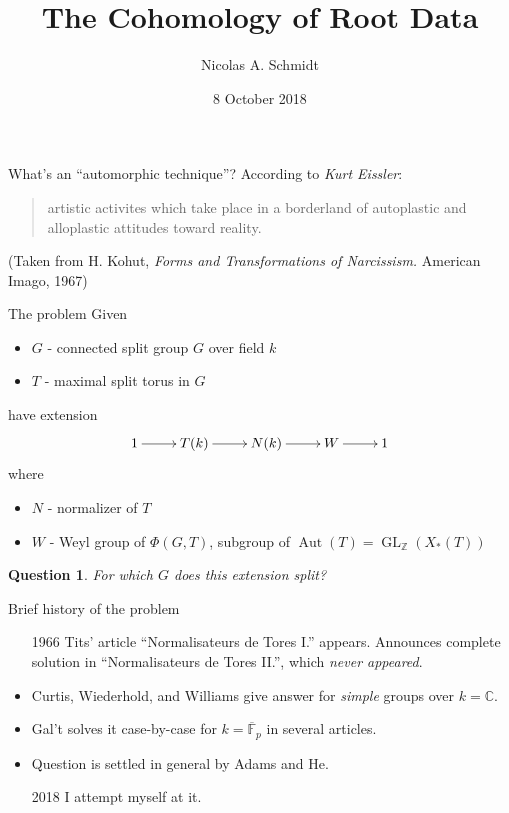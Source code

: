 \documentclass[pdf]{beamer}
\title{The Cohomology of Root Data}
\author{Nicolas A. Schmidt}
\date{8 October 2018}
\newcommand{\op}[1]{\operatorname{#1}}
\newcommand{\bbf}[1]{\mathds{#1}}
\newcommand{\Z}{\bbf{Z}}
\newcommand{\F}{\bbf{F}}
\newcommand{\C}{\bbf{C}}
\newtheorem{question}{Question}
\begin{document}
\begin{frame}
   \titlepage
\end{frame}

\begin{frame}{What's an ``automorphic technique''?}
   \pause
   According to \textit{Kurt Eissler}:
  \pause
   \blockquote[]{
       artistic activites which take place in a borderland of autoplastic and alloplastic attitudes toward reality.
   }
   (Taken from H. Kohut, \textit{Forms and Transformations of Narcissism.} American Imago, 1967)
\end{frame}

\begin{frame}{The problem}
   \pause{}Given
   \begin{itemize}
      \item $G$ - connected split  group $G$ over field $k$\pause
      \item $T$ - maximal split torus in $G$
   \end{itemize}
   \pause have extension
   \[ \xymatrix{ 1 \ar[r] & T(k) \ar[r] & N(k) \ar[r] & W \ar[r] & 1 } \]
   \pause where
   \begin{itemize}
      \item $N$ - normalizer of $T$\pause
      \item $W$ - Weyl group of $\Phi(G,T)$\pause{}, subgroup of $\op{Aut}(T) = \op{GL}_{\Z}(X_\ast(T))$
   \end{itemize}\pause
   \begin{question}\label{q:one}
   For which $G$ does this extension split?
   \end{question}
\end{frame}

\begin{frame}{Brief history of the problem}
   \pause\begin{itemize}
      \item[1966] Tits' article ``Normalisateurs de Tores I.'' appears. \pause Announces complete solution in ``Normalisateurs de Tores II.''\pause , which \textit{never appeared}.\pause 
      \item<-8>[1974] Curtis, Wiederhold, and Williams give answer for \textit{simple} groups over $k = \C$.\pause
      \item<-8>[2013--17] Gal't solves it case-by-case for $k = \overline{\F}_p$ in several articles.\pause
      \item<-8>[2017] Question is settled in general by Adams and He.\pause
      \item[2018] I attempt myself at it.\pause
   \end{itemize}
\end{frame}
\end{document}
